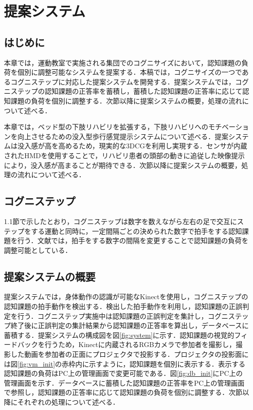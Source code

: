 \chapter{提案システム}

\thispagestyle{myheadings}

\section{はじめに}
本章では，運動教室で実施される集団でのコグニサイズにおいて，認知課題の負荷を個別に調整可能なシステムを提案する．本稿では，コグニサイズの一つであるコグニステップに対応した提案システムを開発する．提案システムでは，コグニステップの認知課題の正答率を蓄積し，蓄積した認知課題の正答率に応じて認知課題の負荷を個別に調整する．次節以降に提案システムの概要，処理の流れについて述べる．

本章では，ベッド型の下肢リハビリを拡張する，下肢リハビリへのモチベーションを向上させるための没入型歩行感覚提示システムについて述べる．提案システムは没入感が高を高めるため，現実的な3DCGを利用し実現する．センサが内蔵されたHMDを使用することで，リハビリ患者の頭部の動きに追従した映像提示により，没入感が高まることが期待できる．次節以降に提案システムの概要，処理の流れについて述べる．
\fi

\section{コグニステップ}
1.1節で示したとおり，コグニステップは数字を数えながら左右の足で交互にステップをする運動と同時に，一定間隔ごとの決められた数字で拍手をする認知課題を行う．文献\cite{認知症予防へ向けた運動コグニサイズ}では，拍手をする数字の間隔を変更することで認知課題の負荷を調整可能としている．

\section{提案システムの概要}
提案システムでは，身体動作の認識が可能なKinectを使用し，コグニステップの認知課題の拍手動作を検出する．検出した拍手動作を利用し，認知課題の正誤判定を行う．コグニステップ実施中は認知課題の正誤判定を集計し，コグニステップ終了後に正誤判定の集計結果から認知課題の正答率を算出し，データベースに蓄積する．提案システムの構成図を図\ref{fig:system}に示す．認知課題の視覚的フィードバックを行うため，Kinectに内蔵されるRGBカメラで参加者を撮影し，撮影した動画を参加者の正面にプロジェクタで投影する．プロジェクタの投影面には図\ref{fig:vm_init}の赤枠内に示すように，認知課題を個別に表示する．表示する認知課題の負荷はPC上の管理画面で変更可能である．図\ref{fig:db_init}にPC上の管理画面を示す．データベースに蓄積した認知課題の正答率をPC上の管理画面で参照し，認知課題の正答率に応じて認知課題の負荷を個別に調整する．次節以降にそれぞれの処理について述べる．

